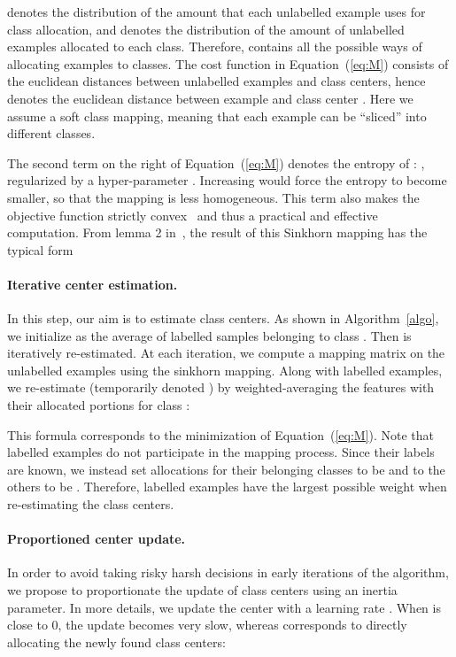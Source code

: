\documentclass[twoside]{article}
\begin{document}
 denotes the distribution of the amount that each unlabelled example uses for class allocation, and  denotes the distribution of the amount of unlabelled examples allocated to each class. Therefore,  contains all the possible ways of allocating examples to classes. The cost function  in Equation~(\ref{eq:M}) consists of the euclidean distances between unlabelled examples and class centers, hence  denotes the euclidean distance between example  and class center . Here we assume a soft class mapping, meaning that each example can be ``sliced'' into different classes.

The second term on the right of Equation~(\ref{eq:M}) denotes the entropy of : , regularized by a hyper-parameter . Increasing  would force the entropy to become smaller, so that the mapping is less homogeneous. This term also makes the objective function strictly convex~\cite{cuturi2013sinkhorn, solomon2015convolutional} and thus a practical and effective computation. 
From lemma 2 in~\cite{cuturi2013sinkhorn}, the result of this Sinkhorn mapping has the typical form  


\paragraph{Iterative center estimation.} In this step, our aim is to estimate class centers.
As shown in Algorithm~\ref{algo}, we initialize  as the average of labelled samples belonging to class . Then  is iteratively re-estimated. At each iteration, we compute a mapping matrix  on the unlabelled examples using the sinkhorn mapping. Along with labelled examples, we re-estimate  (temporarily denoted ) by weighted-averaging the features with their allocated portions for class :


This formula corresponds to the minimization of Equation~(\ref{eq:M}). Note that labelled examples do not participate in the mapping process. Since their labels are known, we instead set allocations for their belonging classes to be  and to the others to be . Therefore, labelled examples have the largest possible weight when re-estimating the class centers. 

\paragraph{Proportioned center update.} In order to avoid taking risky harsh decisions in early iterations of the algorithm, we propose to proportionate the update of class centers using an inertia parameter. In more details, we update the center with a learning rate . When  is close to 0, the update becomes very slow, whereas  corresponds to directly allocating the newly found class centers:
\end{document}
